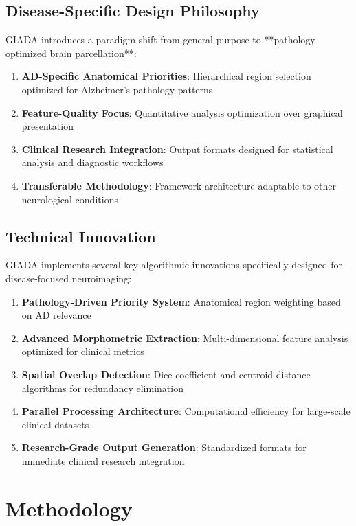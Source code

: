 \documentclass[a4paper,11pt]{article}
\begin{document}
\subsection{Disease-Specific Design Philosophy}

GIADA introduces a paradigm shift from general-purpose to **pathology-optimized brain parcellation**:

\begin{enumerate}
    \item \textbf{AD-Specific Anatomical Priorities}: Hierarchical region selection optimized for Alzheimer's pathology patterns
    \item \textbf{Feature-Quality Focus}: Quantitative analysis optimization over graphical presentation
    \item \textbf{Clinical Research Integration}: Output formats designed for statistical analysis and diagnostic workflows
    \item \textbf{Transferable Methodology}: Framework architecture adaptable to other neurological conditions
\end{enumerate}

\subsection{Technical Innovation}

GIADA implements several key algorithmic innovations specifically designed for disease-focused neuroimaging:

\begin{enumerate}
    \item \textbf{Pathology-Driven Priority System}: Anatomical region weighting based on AD relevance
    \item \textbf{Advanced Morphometric Extraction}: Multi-dimensional feature analysis optimized for clinical metrics
    \item \textbf{Spatial Overlap Detection}: Dice coefficient and centroid distance algorithms for redundancy elimination
    \item \textbf{Parallel Processing Architecture}: Computational efficiency for large-scale clinical datasets
    \item \textbf{Research-Grade Output Generation}: Standardized formats for immediate clinical research integration
\end{enumerate}

\section{Methodology}
\end{document}
